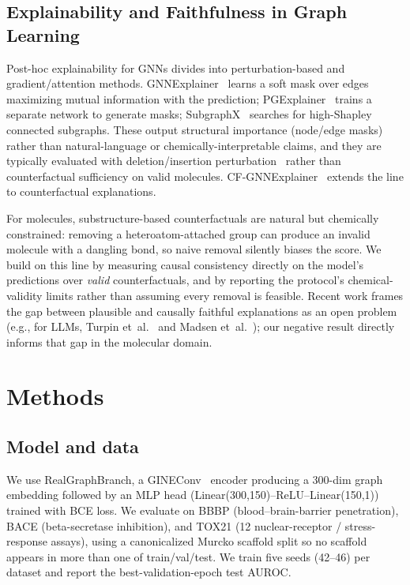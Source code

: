 \documentclass[a4paper,fleqn]{cas-dc}
\begin{document}
\subsection{Explainability and Faithfulness in Graph Learning}
Post-hoc explainability for GNNs divides into perturbation-based and gradient/attention methods. GNNExplainer~\cite{ying2019gnnexplainer} learns a soft mask over edges maximizing mutual information with the prediction; PGExplainer~\cite{luo2020parameterized} trains a separate network to generate masks; SubgraphX~\cite{yuan2021explainability} searches for high-Shapley connected subgraphs. These output structural importance (node/edge masks) rather than natural-language or chemically-interpretable claims, and they are typically evaluated with deletion/insertion perturbation~\cite{deyoung2020eraser} rather than counterfactual sufficiency on valid molecules. CF-GNNExplainer~\cite{lucic2022cfgnnexplainer} extends the line to counterfactual explanations.

For molecules, substructure-based counterfactuals are natural but chemically constrained: removing a heteroatom-attached group can produce an invalid molecule with a dangling bond, so naive removal silently biases the score. We build on this line by measuring causal consistency directly on the model's predictions over \emph{valid} counterfactuals, and by reporting the protocol's chemical-validity limits rather than assuming every removal is feasible. Recent work frames the gap between plausible and causally faithful explanations as an open problem (e.g., for LLMs, Turpin et~al.~\cite{turpin2023language} and Madsen et~al.~\cite{madsen2024selfexplanations}); our negative result directly informs that gap in the molecular domain.

\section{Methods}
\subsection{Model and data}
We use RealGraphBranch, a GINEConv~\cite{xu2019powerful} encoder producing a 300-dim graph embedding followed by an MLP head (Linear(300,150)--ReLU--Linear(150,1)) trained with BCE loss. We evaluate on BBBP (blood--brain-barrier penetration), BACE (beta-secretase inhibition), and TOX21 (12 nuclear-receptor / stress-response assays), using a canonicalized Murcko scaffold split so no scaffold appears in more than one of train/val/test. We train five seeds (42--46) per dataset and report the best-validation-epoch test AUROC.
\end{document}
